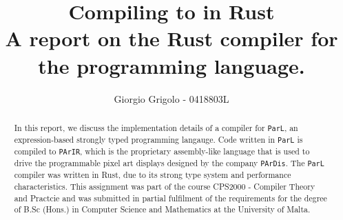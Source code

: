 \documentclass{article}
\title{Compiling \code{ParL} to \code{PArIR} in Rust \\{\normalsize A report on the Rust
compiler for the \code{ParL} programming language.}}
\author{Giorgio Grigolo - 0418803L}
\date{}
\newcommand{\code}[1]{\texttt{#1}}
\begin{document}
\vfill

\thispagestyle{empty}
\maketitle
\thispagestyle{empty}

\vfill
\newpage


\thispagestyle{empty}


\newpage

\tableofcontents



\vfill

\begin{abstract}
  \centering
  In this report, we discuss the implementation details of a
  compiler for \code{ParL}, an expression-based strongly typed programming
  langauge. Code written in \code{ParL} is compiled to \code{PArIR}, which is
  the proprietary assembly-like language that is used to drive the
  programmable pixel art displays designed by the company \code{PArDis}. The
  \code{ParL} compiler was written in Rust, due to its strong type system and
  performance characteristics. This assignment was part of the course CPS2000 -
  Compiler Theory and Practcie and was submitted in partial fulfilment of the
  requirements for the degree of B.Sc (Hons.) in Computer Science and
  Mathematics at the University of Malta.
\end{abstract}

\vfill
\newpage

\newpage


\newpage

\newpage


\newpage




\newpage



\newpage
\printbibliography

\newpage



\newpage
\end{document}
